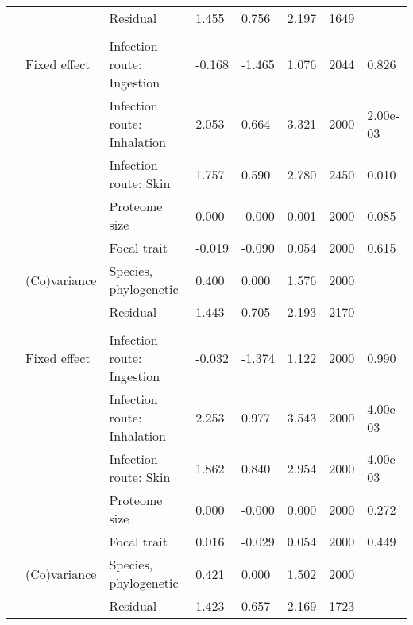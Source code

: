 \begin{table}
\begin{tabular}[t]{llllllll}
\hspace{1em} &  & Residual & 1.455 & 0.756 & 2.197 & 1649 & \\
\addlinespace[0.3em]
\multicolumn{8}{l}{\textbf{Quorum sensing}}\\
\hspace{1em} & Fixed effect & Infection route: Ingestion & -0.168 & -1.465 & 1.076 & 2044 & 0.826\\
\hspace{1em} &  & Infection route: Inhalation & 2.053 & 0.664 & 3.321 & 2000 & 2.00e-03\\
\hspace{1em} &  & Infection route: Skin & 1.757 & 0.590 & 2.780 & 2450 & 0.010\\
\hspace{1em} &  & Proteome size & 0.000 & -0.000 & 0.001 & 2000 & 0.085\\
\hspace{1em} &  & Focal trait & -0.019 & -0.090 & 0.054 & 2000 & 0.615\\
\hspace{1em} & (Co)variance & Species, phylogenetic & 0.400 & 0.000 & 1.576 & 2000 & \\
\hspace{1em} &  & Residual & 1.443 & 0.705 & 2.193 & 2170 & \\
\addlinespace[0.3em]
\multicolumn{8}{l}{\textbf{Secretion systems}}\\
\hspace{1em} & Fixed effect & Infection route: Ingestion & -0.032 & -1.374 & 1.122 & 2000 & 0.990\\
\hspace{1em} &  & Infection route: Inhalation & 2.253 & 0.977 & 3.543 & 2000 & 4.00e-03\\
\hspace{1em} &  & Infection route: Skin & 1.862 & 0.840 & 2.954 & 2000 & 4.00e-03\\
\hspace{1em} &  & Proteome size & 0.000 & -0.000 & 0.000 & 2000 & 0.272\\
\hspace{1em} &  & Focal trait & 0.016 & -0.029 & 0.054 & 2000 & 0.449\\
\hspace{1em} & (Co)variance & Species, phylogenetic & 0.421 & 0.000 & 1.502 & 2000 & \\
\hspace{1em} &  & Residual & 1.423 & 0.657 & 2.169 & 1723 & \\

\end{tabular}
\end{table}
